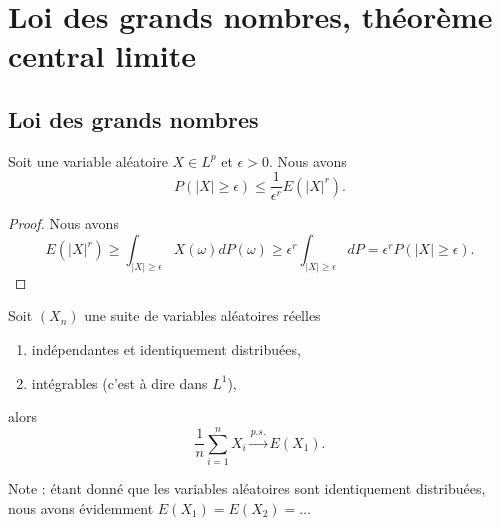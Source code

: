 \section{Loi des grands nombres, théorème central limite}

\subsection{Loi des grands nombres}

\begin{lemma}
    Soit une variable aléatoire \( X\in L^p\) et \( \epsilon>0\). Nous avons
    \begin{equation}
        P(| X |\geq \epsilon)\leq \frac{1}{ \epsilon^r }E(| X |^r).
    \end{equation}
\end{lemma}

\begin{proof}
    Nous avons
    \begin{equation}
        E(| X |^r)\geq\int_{| X |\geq \epsilon}X(\omega)dP(\omega)\geq \epsilon^r\int_{| X |\geq\epsilon}dP=\epsilon^rP(| X |\geq\epsilon).
    \end{equation}
\end{proof}

\begin{theorem}     \label{ThoefQyKZ}
    Soit \( (X_n)\) une suite de variables aléatoires réelles
    \begin{enumerate}
        \item
            indépendantes et identiquement distribuées,
        \item
            intégrables (c'est à dire dans \( L^1\)),
    \end{enumerate}
    alors
    \begin{equation}
        \frac{1}{ n }\sum_{i=1}^nX_i  \stackrel{p.s.}{\longrightarrow} E(X_1).
    \end{equation}
\end{theorem}
Note : étant donné que les variables aléatoires sont identiquement distribuées, nous avons évidemment \( E(X_1)=E(X_2)=\ldots\)

